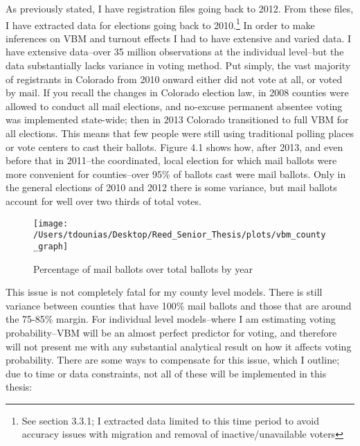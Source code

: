 \documentclass[12pt,twoside]{reedthesis}
\begin{document}
  As previously stated, I have registration files going back to 2012. From
  these files, I have extracted data for elections going back to
  2010.\footnote{See section 3.3.1; I extracted data limited to this time
    period to avoid accuracy issues with migration and removal of
    inactive/unavailable voters} In order to make inferences on VBM and
  turnout effects I had to have extensive and varied data. I have
  extensive data--over 35 million observations at the individual
  level--but the data substantially lacks variance in voting method. Put
  simply, the vast majority of registrants in Colorado from 2010 onward
  either did not vote at all, or voted by mail. If you recall the changes
  in Colorado election law, in 2008 counties were allowed to conduct all
  mail elections, and no-excuse permanent absentee voting was implemented
  state-wide; then in 2013 Colorado transitioned to full VBM for all
  elections. This means that few people were still using traditional
  polling places or vote centers to cast their ballots. Figure 4.1 shows
  how, after 2013, and even before that in 2011--the coordinated, local
  election for which mail ballots were more convenient for counties--over
  95\% of ballots cast were mail ballots. Only in the general elections of
  2010 and 2012 there is some variance, but mail ballots account for well
  over two thirds of total votes.
  
  \begin{figure}
  
  {\centering \texttt{[image: /Users/tdounias/Desktop/Reed\_Senior\_Thesis/plots/vbm\_county\_graph]} 
  
  }
  
  \caption[Percentage of mail ballots over total ballots by year]{Percentage of mail ballots over total ballots by year}\label{fig:vbm png}
  \end{figure}
  
  This issue is not completely fatal for my county level models. There is
  still variance between counties that have 100\% mail ballots and those
  that are around the 75-85\% margin. For individual level models--where I
  am estimating voting probability--VBM will be an almost perfect
  predictor for voting, and therefore will not present me with any
  substantial analytical result on how it affects voting probability.
  There are some ways to compensate for this issue, which I outline; due
  to time or data constraints, not all of these will be implemented in
  this thesis:
  
\end{document}
